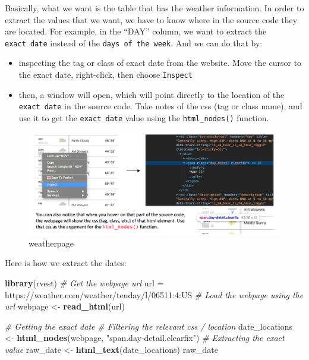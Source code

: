 \documentclass[
]{book}
\newenvironment{Shaded}{\begin{snugshade}}{\end{snugshade}}
\newcommand{\CommentTok}[1]{\textcolor[rgb]{0.56,0.35,0.01}{\textit{#1}}}
\newcommand{\KeywordTok}[1]{\textcolor[rgb]{0.13,0.29,0.53}{\textbf{#1}}}
\newcommand{\NormalTok}[1]{#1}
\newcommand{\StringTok}[1]{\textcolor[rgb]{0.31,0.60,0.02}{#1}}
\providecommand{\tightlist}{%
  \setlength{\itemsep}{0pt}\setlength{\parskip}{0pt}}
\begin{document}
Basically, what we want is the table that has the weather information. In order to extract the values that we want, we have to know where in the source code they are located. For example, in the ``DAY'' column, we want to extract the \texttt{exact\ date} instead of the \texttt{days\ of\ the\ week}. And we can do that by:

\begin{itemize}
\tightlist
\item
  inspecting the tag or class of exact date from the website. Move the cursor to the exact date, right-click, then choose \texttt{Inspect}
\item
  then, a window will open, which will point directly to the location of the \texttt{exact\ date} in the source code. Take notes of the css (tag or class name), and use it to get the \texttt{exact\ date} value using the \texttt{html\_nodes()} function.
\end{itemize}

\begin{figure}
\centering
\includegraphics{images/webcss.png}
\caption{weatherpage}
\end{figure}

Here is how we extract the dates:

\begin{Shaded}
\begin{Highlighting}[]
\KeywordTok{library}\NormalTok{(rvest)}
\CommentTok{\# Get the webpage url}
\NormalTok{url =}\StringTok{ \textquotesingle{}https://weather.com/weather/tenday/l/06511:4:US\textquotesingle{}}
\CommentTok{\# Load the webpage using the url}
\NormalTok{webpage \textless{}{-}}\StringTok{ }\KeywordTok{read\_html}\NormalTok{(url)}

\CommentTok{\# Getting the exact date}
\CommentTok{\# Filtering the relevant css / location}
\NormalTok{date\_locations \textless{}{-}}\StringTok{ }\KeywordTok{html\_nodes}\NormalTok{(webpage, }\StringTok{"span.day{-}detail.clearfix"}\NormalTok{)}
\CommentTok{\# Extracting the exact value}
\NormalTok{raw\_date \textless{}{-}}\StringTok{ }\KeywordTok{html\_text}\NormalTok{(date\_locations)}
\NormalTok{raw\_date}
\end{Highlighting}
\end{Shaded}
\end{document}
